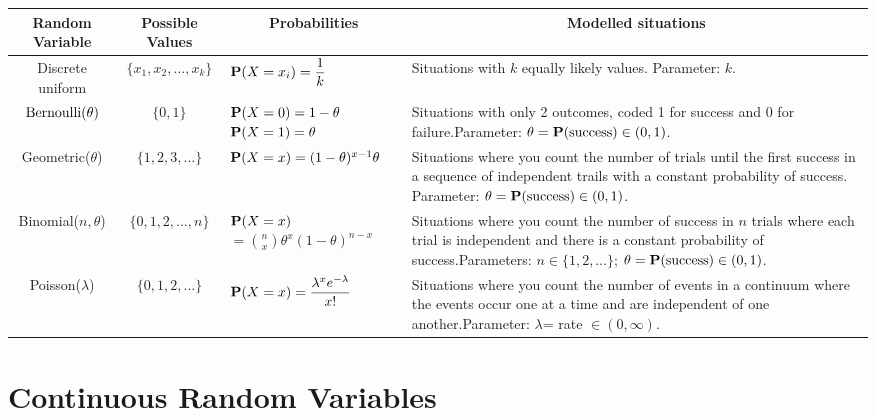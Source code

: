 \begin{center}
{\renewcommand{\arraystretch}{1.5}
\begin{tabular}{|c|c|p{3.2cm}|p{6.2cm}|}
\multicolumn{1}{c}{\bf Random  Variable} & \multicolumn{1}{c}{\bf Possible  Values}
&\multicolumn{1}{c}{\bf Probabilities} &\multicolumn{1}{c}{\bf Modelled situations} \\\hline
Discrete  uniform&$\{x_1,x_2,\dots,x_k\}$&$\mathbf{P}(X=x_i)=\displaystyle\frac{1}{k}$&Situations with $k$ equally likely values.  Parameter: $k$.\\\hline
$\mbox{{\rm Bernoulli}}(\theta)$&$\{0,1\}$&$\mathbf{P}(X=0)=1-\theta$\newline$\mathbf{P}(X=1)=\theta$&Situations with only 2 outcomes, coded 1 for success and 0 for failure.\newline Parameter: $\theta=\mathbf{P}(\textrm{success}) \in (0, 1)$.\\\hline
Geometric($\theta$)&$\{1,2,3,\dots\}$&$\p(X=x)\newline=(1-\theta)^{x-1}\theta$& Situations where you count the number of trials until the first success in a sequence of independent trails with a constant probability of success. \newline Parameter: $\theta=\mathbf{P}(\textrm{success}) \in (0, 1)$.\\\hline
Binomial($n,\theta$)&$\{0,1,2,\dots,n\}$&$\mathbf{P}(X=x)$\newline $=\displaystyle\binom{n}{x}\theta^x(1-\theta)^{n-x}$&Situations where you count the number of success in $n$ trials where each trial is independent and there is a constant probability of success.\newline Parameters: $n \in \{1,2,\ldots\}$; $\theta=\mathbf{P}(\textrm{success}) \in (0, 1)$.\\\hline
Poisson($\lambda$)&$\{0,1,2,\dots\}$&$\p(X=x)\newline=\displaystyle \frac{\lambda^xe^{-\lambda}}{x!}$&Situations where you count the number of events in a continuum where the events occur one at a time and are independent of one another.\newline Parameter: $\lambda$= rate $\in (0,\infty)$.\\\hline
\end{tabular}}
\end{center}

\remove{

}


\section{Continuous Random Variables}
